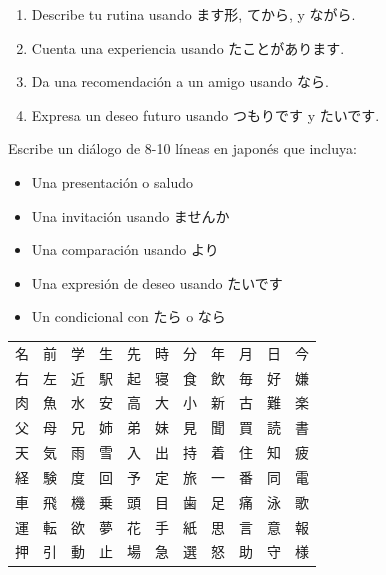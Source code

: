 \begin{tcolorbox}[ejerciciobox, title={🏋️ Nivel 2: Construcción de oraciones}]
\begin{enumerate}
  \item Describe tu rutina usando ます形, てから, y ながら.
  \item Cuenta una experiencia usando たことがあります.
  \item Da una recomendación a un amigo usando なら.
  \item Expresa un deseo futuro usando つもりです y たいです.
\end{enumerate}
\end{tcolorbox}

\begin{tcolorbox}[ejerciciobox, title={🏋️ Nivel 3: Mini-diálogo}]
Escribe un diálogo de 8-10 líneas en japonés que incluya:
\begin{itemize}
  \item Una presentación o saludo
  \item Una invitación usando ませんか
  \item Una comparación usando より
  \item Una expresión de deseo usando たいです
  \item Un condicional con たら o なら
\end{itemize}
\end{tcolorbox}

\begin{tcolorbox}[kanjibox, title={🀄 Mini-índice: Kanjis Esenciales N5→N4}]
\small
\begin{tabular}{ccccccccccc}
名 & 前 & 学 & 生 & 先 & 時 & 分 & 年 & 月 & 日 & 今 \\
右 & 左 & 近 & 駅 & 起 & 寝 & 食 & 飲 & 毎 & 好 & 嫌 \\
肉 & 魚 & 水 & 安 & 高 & 大 & 小 & 新 & 古 & 難 & 楽 \\
父 & 母 & 兄 & 姉 & 弟 & 妹 & 見 & 聞 & 買 & 読 & 書 \\
天 & 気 & 雨 & 雪 & 入 & 出 & 持 & 着 & 住 & 知 & 疲 \\
経 & 験 & 度 & 回 & 予 & 定 & 旅 & 一 & 番 & 同 & 電 \\
車 & 飛 & 機 & 乗 & 頭 & 目 & 歯 & 足 & 痛 & 泳 & 歌 \\
運 & 転 & 欲 & 夢 & 花 & 手 & 紙 & 思 & 言 & 意 & 報 \\
押 & 引 & 動 & 止 & 場 & 急 & 選 & 怒 & 助 & 守 & 様 \\
\end{tabular}
\end{tcolorbox}
